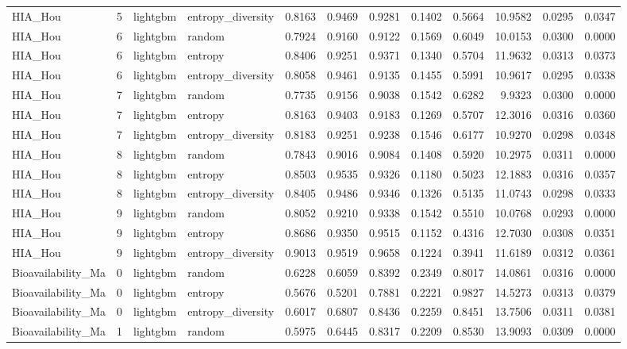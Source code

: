 \begin{tabular}{lrllrrrrrrrr}
HIA_Hou & 5 & lightgbm & entropy_diversity & 0.8163 & 0.9469 & 0.9281 & 0.1402 & 0.5664 & 10.9582 & 0.0295 & 0.0347 \\
HIA_Hou & 6 & lightgbm & random & 0.7924 & 0.9160 & 0.9122 & 0.1569 & 0.6049 & 10.0153 & 0.0300 & 0.0000 \\
HIA_Hou & 6 & lightgbm & entropy & 0.8406 & 0.9251 & 0.9371 & 0.1340 & 0.5704 & 11.9632 & 0.0313 & 0.0373 \\
HIA_Hou & 6 & lightgbm & entropy_diversity & 0.8058 & 0.9461 & 0.9135 & 0.1455 & 0.5991 & 10.9617 & 0.0295 & 0.0338 \\
HIA_Hou & 7 & lightgbm & random & 0.7735 & 0.9156 & 0.9038 & 0.1542 & 0.6282 & 9.9323 & 0.0300 & 0.0000 \\
HIA_Hou & 7 & lightgbm & entropy & 0.8163 & 0.9403 & 0.9183 & 0.1269 & 0.5707 & 12.3016 & 0.0316 & 0.0360 \\
HIA_Hou & 7 & lightgbm & entropy_diversity & 0.8183 & 0.9251 & 0.9238 & 0.1546 & 0.6177 & 10.9270 & 0.0298 & 0.0348 \\
HIA_Hou & 8 & lightgbm & random & 0.7843 & 0.9016 & 0.9084 & 0.1408 & 0.5920 & 10.2975 & 0.0311 & 0.0000 \\
HIA_Hou & 8 & lightgbm & entropy & 0.8503 & 0.9535 & 0.9326 & 0.1180 & 0.5023 & 12.1883 & 0.0316 & 0.0357 \\
HIA_Hou & 8 & lightgbm & entropy_diversity & 0.8405 & 0.9486 & 0.9346 & 0.1326 & 0.5135 & 11.0743 & 0.0298 & 0.0333 \\
HIA_Hou & 9 & lightgbm & random & 0.8052 & 0.9210 & 0.9338 & 0.1542 & 0.5510 & 10.0768 & 0.0293 & 0.0000 \\
HIA_Hou & 9 & lightgbm & entropy & 0.8686 & 0.9350 & 0.9515 & 0.1152 & 0.4316 & 12.7030 & 0.0308 & 0.0351 \\
HIA_Hou & 9 & lightgbm & entropy_diversity & 0.9013 & 0.9519 & 0.9658 & 0.1224 & 0.3941 & 11.6189 & 0.0312 & 0.0361 \\
Bioavailability_Ma & 0 & lightgbm & random & 0.6228 & 0.6059 & 0.8392 & 0.2349 & 0.8017 & 14.0861 & 0.0316 & 0.0000 \\
Bioavailability_Ma & 0 & lightgbm & entropy & 0.5676 & 0.5201 & 0.7881 & 0.2221 & 0.9827 & 14.5273 & 0.0313 & 0.0379 \\
Bioavailability_Ma & 0 & lightgbm & entropy_diversity & 0.6017 & 0.6807 & 0.8436 & 0.2259 & 0.8451 & 13.7506 & 0.0311 & 0.0381 \\
Bioavailability_Ma & 1 & lightgbm & random & 0.5975 & 0.6445 & 0.8317 & 0.2209 & 0.8530 & 13.9093 & 0.0309 & 0.0000 \\

\end{tabular}
